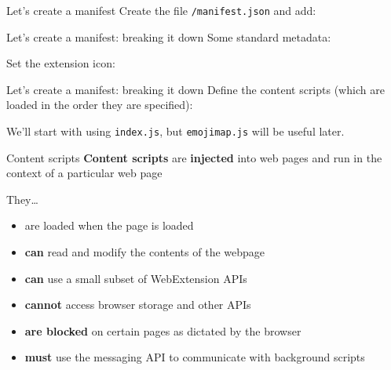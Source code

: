 \documentclass[../index.tex]{subfiles}
\begin{document}
\renewcommand{\currenttitle}{Let's create a manifest}
\begin{frame}[fragile]{\currenttitle}
  Create the file \texttt{/manifest.json} and add:
  
\end{frame}

\renewcommand{\currenttitle}{Let's create a manifest: breaking it down}
\begin{frame}[fragile]{\currenttitle}
  Some standard metadata:
  

  Set the extension icon:
  
\end{frame}

\begin{frame}[fragile]{\currenttitle}
  Define the content scripts (which are loaded in the order they are
  specified):
  

  We'll start with using \texttt{index.js}, but \texttt{emojimap.js} will be
  useful later.
\end{frame}

\renewcommand{\currenttitle}{Content scripts}
\begin{frame}[fragile]{\currenttitle}
  \textbf{Content scripts}\footnotemark{} are \textbf{injected} into web pages and run in the
  context of a particular web page

  They\dots
  \begin{itemize}
    \small
    \item are loaded when the page is loaded
    \item \textbf{can} read and modify the contents of the webpage
    \item \textbf{can} use a small subset of WebExtension APIs
    \item \textbf{cannot} access browser storage and other APIs
    \item \textbf{are blocked} on certain pages as dictated by the browser
    \item \textbf{must} use the messaging API to communicate with background scripts
  \end{itemize}

\end{frame}
\end{document}
